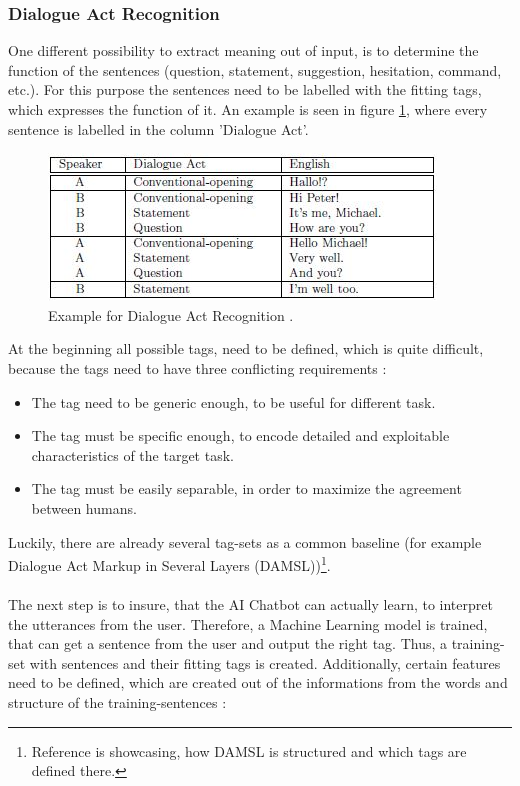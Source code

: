 \documentclass[10pt,final,journal,a4paper,oneside,twocolumn]{IEEEtran}
\begin{document}
\subsubsection{Dialogue Act Recognition}
One different possibility to extract meaning out of input, is to determine the function of the sentences (question, statement, suggestion, hesitation, command, etc.). For this purpose the sentences need to be labelled with the fitting tags, which expresses the function of it. An example is seen in figure \ref{da}, where every sentence is labelled in the column 'Dialogue Act'.
\begin{figure}[htbp]
	\centerline{\includegraphics[width=1\linewidth]{pictures/da.jpg}}
	\caption{Example for Dialogue Act Recognition \cite{b12}.}
	\label{da}
\end{figure}
At the beginning all possible tags, need to be defined, which is quite difficult, because the tags need to have three conflicting requirements \cite{b12}:
\begin{itemize}
	\item The tag need to be generic enough, to be useful for different task.
	\item The tag must be specific enough, to encode detailed and exploitable
	characteristics of the target task.
	\item The tag must be easily separable, in order to maximize the agreement between humans.
\end{itemize}
Luckily, there are already several tag-sets as a common baseline (for example Dialogue Act Markup in Several Layers (DAMSL))\footnote{Reference \cite[p.4]{b12} is showcasing, how DAMSL is structured and which tags are defined there.}.\\
\\
The next step is to insure, that the AI Chatbot can actually learn, to interpret the utterances from the user. Therefore, a Machine Learning model is trained, that can get a sentence from the user and output the right tag. Thus, a training-set with sentences and their fitting tags is created. Additionally, certain features need to be defined, which are created out of the informations from the words and structure of the training-sentences \cite{b12}:
\end{document}
